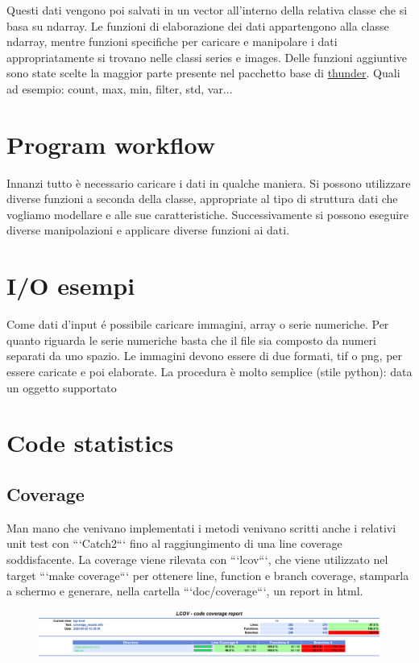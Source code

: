 \documentclass{article}
\begin{document}
Questi dati vengono poi salvati in un vector all'interno della relativa classe che si basa su ndarray. Le funzioni di elaborazione dei dati appartengono alla classe ndarray, mentre funzioni specifiche per caricare e manipolare i dati appropriatamente si trovano nelle classi series e images.
Delle funzioni aggiuntive sono state scelte la maggior parte presente nel pacchetto base di \href{https://github.com/thunder-project/thunder}{thunder}.
Quali ad esempio: count, max, min, filter, std, var...


\section{Program workflow}
Innanzi tutto è necessario caricare i dati in qualche maniera. Si possono utilizzare diverse funzioni a seconda della classe, appropriate al tipo di struttura dati che vogliamo modellare e alle sue caratteristiche.
Successivamente si possono eseguire diverse manipolazioni e applicare diverse funzioni ai dati.

\section{I/O esempi}

Come dati d'input é possibile caricare immagini, array o serie numeriche.
Per quanto riguarda le serie numeriche basta che il file sia composto da numeri separati da uno spazio.
Le immagini devono essere di due formati, tif o png, per essere caricate e poi elaborate.
La procedura è molto semplice (stile python): data un oggetto supportato

\section{Code statistics}
\subsection{Coverage}
Man mano che venivano implementati i metodi venivano scritti anche i relativi unit test con ```Catch2``` fino al raggiungimento di una line coverage soddisfacente.
La coverage viene rilevata con ```lcov```, che viene utilizzato nel target ```make coverage```
per ottenere line, function e branch coverage, stamparla a schermo e generare, nella cartella ```doc/coverage```, un report in html.

\begin{figure}[h]
\includegraphics[width=\textwidth]{Coverage.png}
\end{figure}
\end{document}
